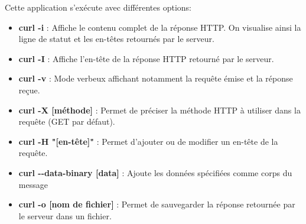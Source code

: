 \documentclass[11pt,a4paper]{article}
\begin{document}
Cette application s'exécute avec différentes options:
\begin{itemize}
\item \textbf{curl -i} : Affiche le contenu complet de la réponse HTTP. On visualise ainsi la ligne de statut et les en-têtes retournés par le serveur.
\item \textbf{curl -I} : Affiche l'en-tête de la réponse HTTP retourné par le serveur.
\item \textbf{curl -v} : Mode verbeux affichant notamment la requête émise et la réponse reçue.

\item \textbf{curl -X [méthode]} : Permet de préciser la méthode HTTP à utiliser dans la requête (GET par défaut).

\item \textbf{curl -H "[en-tête]"} : Permet d'ajouter ou de modifier un en-tête de la requête.

\item \textbf{curl -{}-data-binary [data]} : Ajoute les données spécifiées comme corps du message

\item \textbf{curl -o [nom de fichier]} : Permet de sauvegarder la réponse retournée par le serveur dans un fichier. 
\end{itemize}
\end{document}
